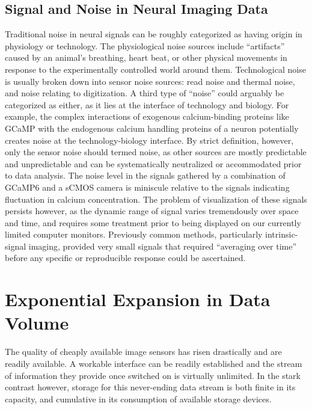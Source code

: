 \documentclass[../main.tex]{subfiles}
\begin{document}
\subsection{Signal and Noise in Neural Imaging Data}
\label{sec:signal-and-noise-in-neural-imaging-data}

Traditional noise in neural signals can be roughly categorized as having origin in physiology or technology.
The physiological noise sources include “artifacts” caused by an animal’s breathing, heart beat, or other physical movements in response to the experimentally controlled world around them.
Technological noise is usually broken down into sensor noise sources:  read noise and thermal noise, and noise relating to digitization.
A third type of “noise” could arguably be categorized as either, as it lies at the interface of technology and biology.
For example, the complex interactions of exogenous calcium-binding proteins like GCaMP with the endogenous calcium handling proteins of a neuron potentially creates noise at the technology-biology interface.
By strict definition, however, only the sensor noise should termed noise, as other sources are mostly predictable and unpredictable and can be systematically neutralized or accommodated prior to data analysis.
The noise level in the signals gathered by a combination of GCaMP6 and a sCMOS camera is miniscule relative to the signals indicating fluctuation in calcium concentration.
The problem of visualization of these signals persists however, as the dynamic range of signal varies tremendously over space and time, and requires some treatment prior to being displayed on our currently limited computer monitors.
Previously common methods, particularly intrinsic-signal imaging, provided very small signals that required “averaging over time” before any specific or reproducible response could be ascertained.

\section{Exponential Expansion in Data Volume}
\label{sec:exponential-expansion-in-data-volume}

The quality of cheaply available image sensors has risen drastically and are readily available.
A workable interface can be readily established and the stream of information they provide once switched on is virtually unlimited.
In the stark contrast however, storage for this never-ending data stream is both finite in its capacity, and cumulative in its consumption of available storage devices.
\end{document}

